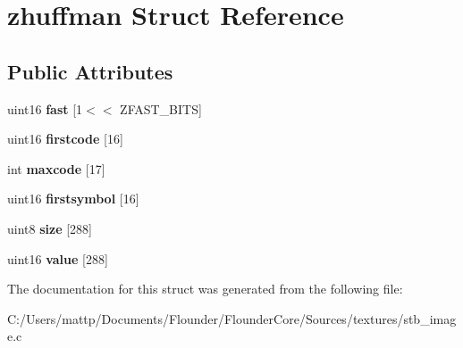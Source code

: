 \hypertarget{structzhuffman}{}\section{zhuffman Struct Reference}
\label{structzhuffman}
\subsection*{Public Attributes}
\begin{DoxyCompactItemize}
\item 
\mbox{\label{structzhuffman_a12d5f92a121b65680e5f0b4027d00c96}} 
uint16 {\bfseries fast} \mbox{[}1$<$$<$ Z\+F\+A\+S\+T\+\_\+\+B\+I\+TS\mbox{]}
\item 
\mbox{\label{structzhuffman_a81f5ae5bd31b40439955de6154572917}} 
uint16 {\bfseries firstcode} \mbox{[}16\mbox{]}
\item 
\mbox{\label{structzhuffman_ac7dd4a2bf01a6e27933dd1cf6b0cc762}} 
int {\bfseries maxcode} \mbox{[}17\mbox{]}
\item 
\mbox{\label{structzhuffman_afbdb21fd99f413fc8f9e58243552fe95}} 
uint16 {\bfseries firstsymbol} \mbox{[}16\mbox{]}
\item 
\mbox{\label{structzhuffman_a46ce4d4a4d7fc41c2560616f6696e9b9}} 
uint8 {\bfseries size} \mbox{[}288\mbox{]}
\item 
\mbox{\label{structzhuffman_acc395b638b700b944c329d71a8b82084}} 
uint16 {\bfseries value} \mbox{[}288\mbox{]}
\end{DoxyCompactItemize}


The documentation for this struct was generated from the following file\+:\begin{DoxyCompactItemize}
\item 
C\+:/\+Users/mattp/\+Documents/\+Flounder/\+Flounder\+Core/\+Sources/textures/stb\+\_\+image.\+c\end{DoxyCompactItemize}
